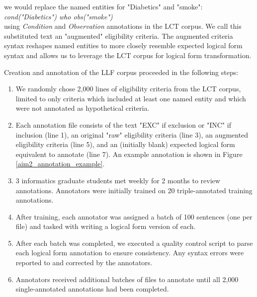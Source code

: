 \documentclass[../main.tex]{subfiles}
\begin{document}
\noindent we would replace the named entities for "Diabetics" and "smoke": \\ 

\textit{cond("Diabetics") who obs("smoke")} \\

\noindent using \textit{Condition} and \textit{Observation} annotations in the LCT corpus. We call this substituted text an "augmented" eligibility criteria. The augmented criteria syntax reshapes named entities to more closely resemble expected logical form syntax and allows us to leverage the LCT corpus for logical form transformation.

Creation and annotation of the LLF corpus proceeded in the following steps:

\begin{enumerate}
    \item We randomly chose 2,000 lines of eligibility criteria from the LCT corpus, limited to only criteria which included at least one named entity and which were not annotated as hypothetical criteria.
    \item  Each annotation file consists of the text "EXC" if exclusion or "INC" if inclusion (line 1), an original "raw" eligibility criteria (line 3), an augmented eligibility criteria (line 5), and an (initially blank) expected logical form equivalent to annotate (line 7). An example annotation is shown in Figure \ref{aim2_annotation_example}.
    \item 3 informatics graduate students met weekly for 2 months to review annotations. Annotators were initially trained on 20 triple-annotated training annotations. 
    \item After training, each annotator was assigned a batch of 100 sentences (one per file) and tasked with writing a logical form version of each.
    \item After each batch was completed, we executed a quality control script to parse each logical form annotation to ensure consistency. Any syntax errors were reported to and corrected by the annotators.
    \item Annotators received additional batches of files to annotate until all 2,000 single-annotated annotations had been completed.
\end{enumerate}
\end{document}
